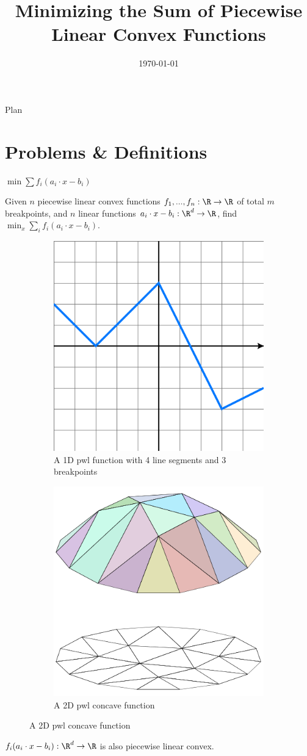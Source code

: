 \documentclass{beamer}
\title[template example]{Minimizing the Sum of Piecewise Linear Convex Functions}
\date{\today}
\author{\texorpdfstring{\zh{丛宇}}{Yu Cong}}
\begin{document}
\begin{frame}[plain]
    \titlepage
\end{frame}

\begin{frame}[plain]{Plan}
    \tableofcontents
\end{frame}

\section{Problems \& Definitions}
\begin{frame}{$\min \sum f_i(a_i\cdot x-b_i)$}
\begin{problem}
    Given $n$ piecewise linear convex functions $f_1,...,f_n:\R \to \R$ of total $m$ breakpoints, and $n$ linear functions $a_i\cdot x-b_i:\R^d\to \R$, find $\min_x \sum_i f_i(a_i\cdot x-b_i)$.
\end{problem}
\begin{figure}
    \centering
    \begin{subfigure}{.5\textwidth}
      \centering
      \includegraphics[width=.4\linewidth]{images/Piecewise_linear_function.svg.png}
      \caption{A 1D pwl function with 4 line segments and 3 breakpoints}
      \label{fig:sub1}
    \end{subfigure}%
    \begin{subfigure}{.5\textwidth}
      \centering
      \includegraphics[width=.4\linewidth]{images/Piecewise_linear_function2D.png}
      \caption{A 2D pwl concave function}
      \label{fig:sub2}
    \end{subfigure}
    \label{fig:1}
    \end{figure}
    $f_i(a_i\cdot x-b_i):\R^d\to \R$ is also piecewise linear convex.
\end{frame}
\end{document}
